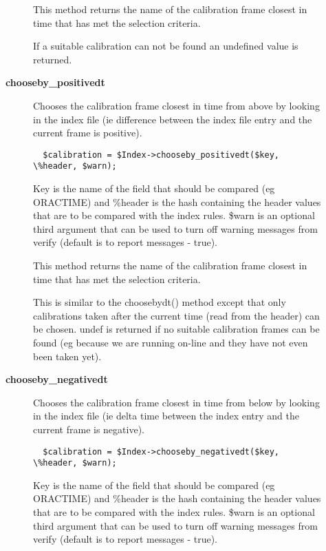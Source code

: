 \begin{description}
\begin{description}
This method returns the name of the calibration frame closest in 
time that has met the selection criteria.



If a suitable calibration can not be found an undefined value is returned.


\item[{\textbf{chooseby\_positivedt}}] \mbox{}

Chooses the calibration frame closest in time from above by looking 
in the index file (ie difference between the index file entry and
the current frame is positive).

\begin{verbatim}
  $calibration = $Index->chooseby_positivedt($key, \%header, $warn);
\end{verbatim}


Key is the name of the field that should be compared (eg ORACTIME)
and \%header is the hash containing the header values that are to
be compared with the index rules. \$warn is an optional third argument
that can be used to turn off warning messages from verify (default
is to report messages - true).



This method returns the name of the calibration frame closest in 
time that has met the selection criteria.



This is similar to the choosebydt() method except that only
calibrations taken after the current time (read from the
header) can be chosen. undef is returned if no suitable
calibration frames can be found (eg because we are running
on-line and they have not even been taken yet).


\item[{\textbf{chooseby\_negativedt}}] \mbox{}

Chooses the calibration frame closest in time from below by looking 
in the index file (ie delta time between the index entry and the 
current frame is negative).

\begin{verbatim}
  $calibration = $Index->chooseby_negativedt($key, \%header, $warn);
\end{verbatim}


Key is the name of the field that should be compared (eg ORACTIME)
and \%header is the hash containing the header values that are to
be compared with the index rules. \$warn is an optional third argument
that can be used to turn off warning messages from verify (default
is to report messages - true).




\end{description}
\end{description}
